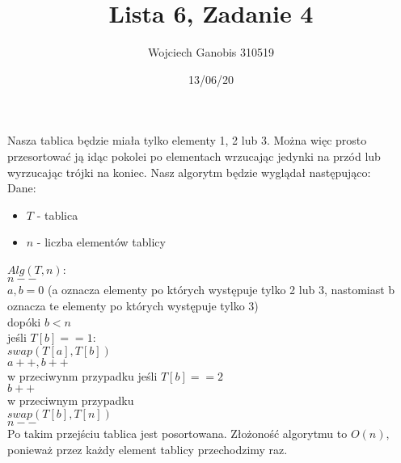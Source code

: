 \documentclass{article}
\title{Lista 6, Zadanie 4}
\author{Wojciech Ganobis 310519}
\date{13/06/20}
\newcommand\tab[1][1cm]{\hspace*{#1}}
\begin{document}
\maketitle
 Nasza tablica będzie miała tylko elementy 1, 2 lub 3. Można więc prosto przesortować ją idąc pokolei po elementach wrzucając jedynki na przód lub wyrzucając trójki na koniec. Nasz algorytm będzie wyglądał następująco:\\
Dane:
\begin{itemize}
\item $T$ - tablica
\item $n$ - liczba elementów tablicy
\end{itemize}
$Alg(T, n)$:\\
\tab $n--$\\
\tab $a , b = 0$ (a oznacza elementy po których występuje tylko 2 lub 3, nastomiast b oznacza te elementy po których występuje tylko 3)\\
\tab dopóki $b < n$\\
\tab \tab jeśli $T[b] == 1$:\\
\tab \tab \tab $swap(T[a], T[b])$\\
\tab \tab \tab $a++, b++$\\
\tab \tab w przeciwynm przypadku jeśli $T[b] == 2$\\
\tab \tab \tab $b++$\\
\tab \tab w przeciwnym przypadku\\
\tab \tab \tab $swap(T[b], T[n])$\\
\tab \tab \tab $n--$\\

Po takim przejściu tablica jest posortowana. Złożoność algorytmu to $O(n)$, ponieważ przez każdy element tablicy przechodzimy raz.
\end{document}
